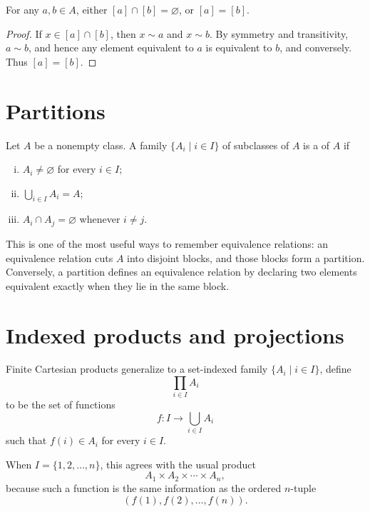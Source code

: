 \begin{lemma}
For any \(a,b\in A\), either \([a]\cap[b]=\varnothing\), or \([a]=[b]\).
\end{lemma}

\begin{proof}
If \(x\in [a]\cap[b]\), then \(x\sim a\) and \(x\sim b\).  By symmetry and transitivity, \(a\sim b\), and hence any element equivalent to \(a\) is equivalent to \(b\), and conversely.  Thus \([a]=[b]\).
\end{proof}

\section{Partitions}

\begin{definition}
Let \(A\) be a nonempty class.  A family \(\{A_i\mid i\in I\}\) of subclasses of \(A\) is a  of \(A\) if
\begin{enumerate}[(i)]
  \item \(A_i\neq\varnothing\) for every \(i\in I\);
  \item \(\bigcup_{i\in I} A_i=A\);
  \item \(A_i\cap A_j=\varnothing\) whenever \(i\neq j\).
\end{enumerate}
\end{definition}

\begin{remark}
This is one of the most useful ways to remember equivalence relations: an equivalence relation cuts \(A\) into disjoint blocks, and those blocks form a partition.  Conversely, a partition defines an equivalence relation by declaring two elements equivalent exactly when they lie in the same block.
\end{remark}

\section{Indexed products and projections}

Finite Cartesian products generalize to a set-indexed family \(\{A_i\mid i\in I\}\), define
\[
  \prod_{i\in I}A_i
\]
to be the set of functions
\[
  f:I\to \bigcup_{i\in I}A_i
\]
such that \(f(i)\in A_i\) for every \(i\in I\).

When \(I=\{1,2,\dots,n\}\), this agrees with the usual product
\[
  A_1\times A_2\times\cdots\times A_n,
\]
because such a function is the same information as the ordered \(n\)-tuple
\[
  (f(1),f(2),\dots,f(n)).
\]

